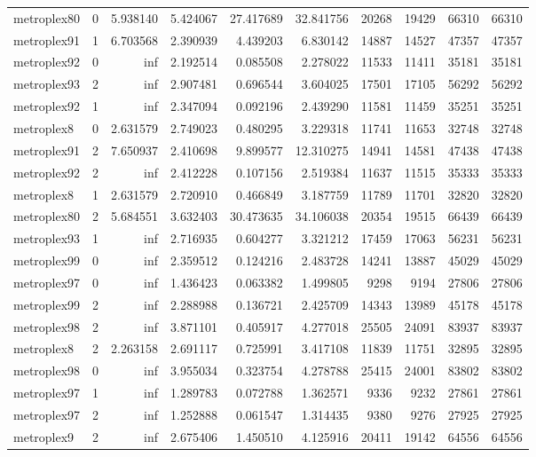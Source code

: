 \begin{longtable}{|l|r|r|r|r|r|r|r|r|r|}
metroplex80 & 0 & 5.938140 & 5.424067 & 27.417689 & 32.841756 & 20268 & 19429 & 66310 & 66310 \\
metroplex91 & 1 & 6.703568 & 2.390939 & 4.439203 & 6.830142 & 14887 & 14527 & 47357 & 47357 \\
metroplex92 & 0 & inf & 2.192514 & 0.085508 & 2.278022 & 11533 & 11411 & 35181 & 35181 \\
metroplex93 & 2 & inf & 2.907481 & 0.696544 & 3.604025 & 17501 & 17105 & 56292 & 56292 \\
metroplex92 & 1 & inf & 2.347094 & 0.092196 & 2.439290 & 11581 & 11459 & 35251 & 35251 \\
metroplex8 & 0 & 2.631579 & 2.749023 & 0.480295 & 3.229318 & 11741 & 11653 & 32748 & 32748 \\
metroplex91 & 2 & 7.650937 & 2.410698 & 9.899577 & 12.310275 & 14941 & 14581 & 47438 & 47438 \\
metroplex92 & 2 & inf & 2.412228 & 0.107156 & 2.519384 & 11637 & 11515 & 35333 & 35333 \\
metroplex8 & 1 & 2.631579 & 2.720910 & 0.466849 & 3.187759 & 11789 & 11701 & 32820 & 32820 \\
metroplex80 & 2 & 5.684551 & 3.632403 & 30.473635 & 34.106038 & 20354 & 19515 & 66439 & 66439 \\
metroplex93 & 1 & inf & 2.716935 & 0.604277 & 3.321212 & 17459 & 17063 & 56231 & 56231 \\
metroplex99 & 0 & inf & 2.359512 & 0.124216 & 2.483728 & 14241 & 13887 & 45029 & 45029 \\
metroplex97 & 0 & inf & 1.436423 & 0.063382 & 1.499805 & 9298 & 9194 & 27806 & 27806 \\
metroplex99 & 2 & inf & 2.288988 & 0.136721 & 2.425709 & 14343 & 13989 & 45178 & 45178 \\
metroplex98 & 2 & inf & 3.871101 & 0.405917 & 4.277018 & 25505 & 24091 & 83937 & 83937 \\
metroplex8 & 2 & 2.263158 & 2.691117 & 0.725991 & 3.417108 & 11839 & 11751 & 32895 & 32895 \\
metroplex98 & 0 & inf & 3.955034 & 0.323754 & 4.278788 & 25415 & 24001 & 83802 & 83802 \\
metroplex97 & 1 & inf & 1.289783 & 0.072788 & 1.362571 & 9336 & 9232 & 27861 & 27861 \\
metroplex97 & 2 & inf & 1.252888 & 0.061547 & 1.314435 & 9380 & 9276 & 27925 & 27925 \\
metroplex9 & 2 & inf & 2.675406 & 1.450510 & 4.125916 & 20411 & 19142 & 64556 & 64556 \\

\end{longtable}
